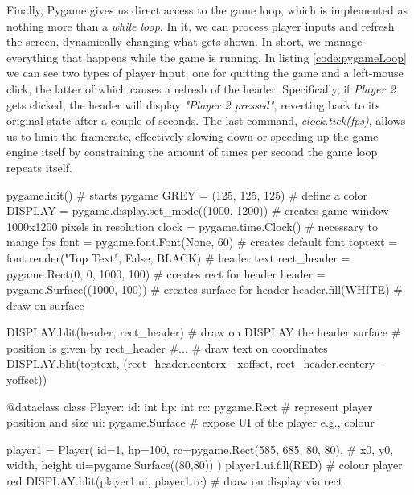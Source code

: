 Finally, Pygame gives us direct access to the game loop, which is implemented as nothing more than a \textit{while loop}. In it, we can process player inputs and refresh the screen, dynamically changing what gets shown. In short, we manage everything that happens while the game is running. In listing \ref{code:pygameLoop} we can see two types of player input, one for quitting the game and a left-mouse click, the latter of which causes a refresh of the header. Specifically, if \textit{Player 2} gets clicked, the header will display \textit{"Player 2 pressed"}, reverting back to its original state after a couple of seconds. The last command, \textit{clock.tick(fps)}, allows us to limit the framerate, effectively slowing down or speeding up the game engine itself by constraining the amount of times per second the game loop repeats itself.

\begin{python}[label={code:pygameIntro}, caption={Pygame base components}]
pygame.init()                                   # starts pygame
GREY = (125, 125, 125)                          # define a color
DISPLAY = pygame.display.set_mode((1000, 1200)) # creates game window 1000x1200 pixels in resolution
clock = pygame.time.Clock()                     # necessary to mange fps
font = pygame.font.Font(None, 60)               # creates default font 
toptext = font.render("Top Text", False, BLACK) # header text
rect_header = pygame.Rect(0, 0, 1000, 100)      # creates rect for header
header = pygame.Surface((1000, 100))            # creates surface for header
header.fill(WHITE)                              # draw on surface 

DISPLAY.blit(header, rect_header)               # draw on DISPLAY the header surface
                                                # position is given by rect_header                                    
#...
# draw text on coordinates
DISPLAY.blit(toptext, (rect_header.centerx - xoffset, rect_header.centery - yoffset))
\end{python}

\begin{python}[label={code:pygamePlayer}, caption={Players defined as dataclassess that encapsulate Pygame elements}]
@dataclass
class Player:
    id: int
    hp: int
    rc: pygame.Rect     # represent player position and size 
    ui: pygame.Surface  # expose UI of the player e.g., colour 

player1 = Player(
    id=1,
    hp=100,
    rc=pygame.Rect(585, 685, 80, 80),  # x0, y0, width, height
    ui=pygame.Surface((80,80))
)
player1.ui.fill(RED)                    # colour player red
DISPLAY.blit(player1.ui, player1.rc)    # draw on display via rect
\end{python}

